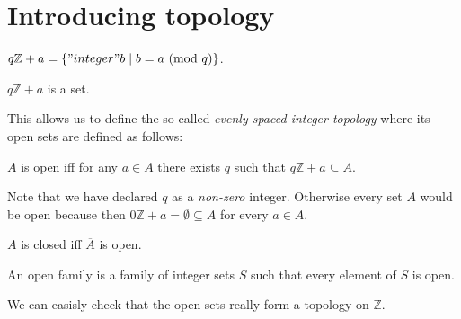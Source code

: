 \documentclass{article}
\renewcommand{\mod}{\text{mod }}
\newcommand{\Int}{\mathbb{Z}}
\begin{document}
  \section{Introducing topology}

  \begin{forthel}
    \begin{definition}[ArSeq]
      $q \Int + a = \{ "integer" b \mid b = a ~(\mod q) \}$.
    \end{definition}

    \begin{lemma}
      $q \Int + a$ is a set.
    \end{lemma}
  \end{forthel}

  This allows us to define the so-called \textit{evenly spaced integer topology} where its open sets are defined as follows:

  \begin{forthel}
    \begin{definition}[Open]
      $A$ is open iff for any $a \in A$ there exists $q$ such that $q \Int + a \subseteq A$.
    \end{definition}
  \end{forthel}

  Note that we have declared $q$ as a \textit{non-zero} integer. Otherwise every set $A$ would be open because then $0 \Int + a = \emptyset \subseteq A$ for every $a \in A$.

  \begin{forthel}
    \begin{definition}[Closed]
      $A$ is closed iff $\overline{A}$ is open.
    \end{definition}

    \begin{definition}[OpenIntegerSets]
      An open family is a family of integer sets $S$ such that every element of $S$ is open.
    \end{definition}
  \end{forthel}

  We can easisly check that the open sets really form a topology on $\Int$.
\end{document}
